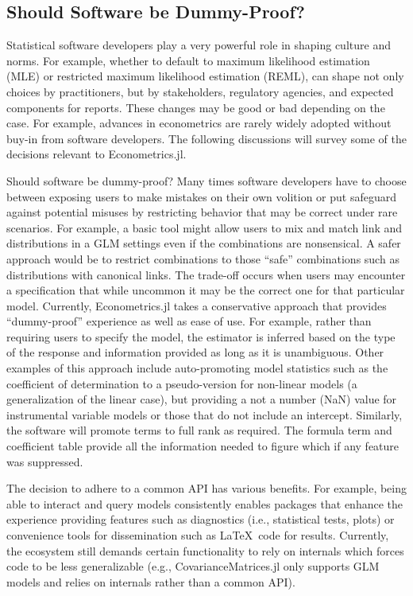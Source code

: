 \documentclass{juliacon}
\begin{document}
\subsection{Should Software be Dummy-Proof?}

Statistical software developers play a very powerful role in shaping culture and norms. For example, whether to default to maximum likelihood estimation (MLE) or restricted maximum likelihood estimation (REML), can shape not only choices by practitioners, but by stakeholders, regulatory agencies, and expected components for reports. These changes may be good or bad depending on the case. For example, advances in econometrics are rarely widely adopted without buy-in from software developers. The following discussions will survey some of the decisions relevant to Econometrics.jl.

Should software be dummy-proof? Many times software developers have to choose between exposing users to make mistakes on their own volition or put safeguard against potential misuses by restricting behavior that may be correct under rare scenarios. For example, a basic tool might allow users to mix and match link and distributions in a GLM settings even if the combinations are nonsensical. A safer approach would be to restrict combinations to those ``safe'' combinations such as distributions with canonical links. The trade-off occurs when users may encounter a specification that while uncommon it may be the correct one for that particular model. Currently, Econometrics.jl takes a conservative approach that provides ``dummy-proof'' experience as well as ease of use. For example, rather than requiring users to specify the model, the estimator is inferred based on the type of the response and information provided as long as it is unambiguous. Other examples of this approach include auto-promoting model statistics such as the coefficient of determination to a pseudo-version for non-linear models (a generalization of the linear case), but providing a not a number (NaN) value for instrumental variable models or those that do not include an intercept. Similarly, the software will promote terms to full rank as required. The formula term and coefficient table provide all the information needed to figure which if any feature was suppressed.

The decision to adhere to a common API has various benefits. For example, being able to interact and query models consistently enables packages that enhance the experience providing features such as diagnostics (i.e., statistical tests, plots) or convenience tools for dissemination such as \LaTeX\ code for results. Currently, the ecosystem still demands certain functionality to rely on internals which forces code to be less generalizable (e.g., CovarianceMatrices.jl only supports GLM models and relies on internals rather than a common API).
\end{document}
